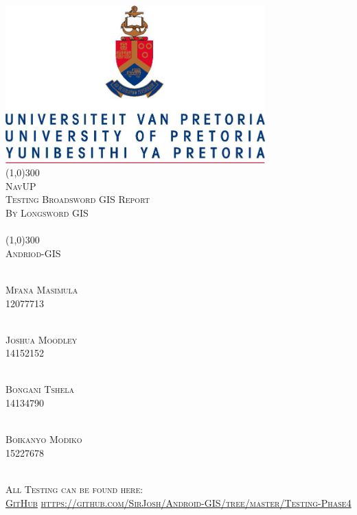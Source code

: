 \documentclass[runningheads,a4paper]{article}
\begin{document}
	
	\begin{titlepage}
		\begin{center}
			\includegraphics[width=10cm]{fig/UP.jpg}  \\
			[1cm]
			\line(1,0){300} \\
			[0.3cm]
			\textsc{\Large
				NavUP\\
				Testing Broadsword GIS Report\\
				By Longsword GIS \\
				\hfill
			}\\
			[0.1cm]
			\line(1,0){300} \\
			[0.7cm]
			\textsc{\Large
				Andriod-GIS
			} \\
		\end{center}
		
		\begin{center}
			\begin{multicols}{2}
				\textsc{\large\\
					Mfana Masimula\\ 
					12077713\\ 
				}
				
				\textsc{\large\\
					Joshua Moodley\\
					14152152\\ 
				}
				
				\textsc{\large\\
					Bongani Tshela\\ 
					14134790\\ 
				}
				
				\textsc{\large\\
					Boikanyo Modiko\\
					15227678\\ 
				}
				
			\end{multicols}
			
			
			\textsc{\\
				All Testing can be found here: \\ \href{https://github.com/SirJosh/Android-GIS/tree/master/Testing-Phase4}{GitHub}
				\url{https://github.com/SirJosh/Android-GIS/tree/master/Testing-Phase4}}
		\end{center}
	\end{titlepage}
	
\end{document}
